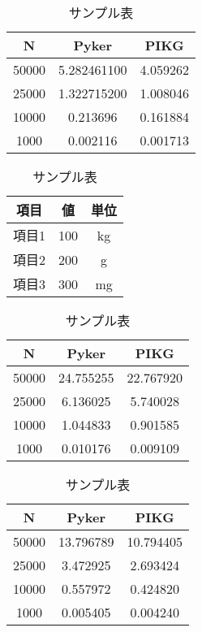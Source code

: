 
\begin{table}[ht]
  \centering %
  \caption{サンプル表} %
  \label{tab:sampleTable}
  \begin{tabular}{ccc} %
  \toprule
  N & Pyker & PIKG \\
  \midrule
  50000 & 5.282461100 & 4.059262 \\
  25000 & 1.322715200 & 1.008046 \\
  10000 & 0.213696 & 0.161884 \\
  1000 & 0.002116 & 0.001713 \\
\bottomrule
\end{tabular}
\end{table}
\begin{table}[ht]
  \centering %
  \caption{サンプル表} %
  \label{tab:sampleTable}
  \begin{tabular}{ccc} %
  \toprule
  項目 & 値 & 単位 \\
  \midrule
  項目1 & 100 & kg \\
  項目2 & 200 & g \\
  項目3 & 300 & mg \\
\bottomrule
\end{tabular}
\end{table}


\begin{table}[ht]
  \centering %
  \caption{サンプル表} %
  \label{tab:sampleTable}
  \begin{tabular}{ccc} %
  \toprule
  N & Pyker & PIKG \\
  \midrule
  50000 & 24.755255 & 22.767920 \\
  25000 & 6.136025 & 5.740028 \\
  10000 & 1.044833 & 0.901585\\
  1000 & 0.010176 & 0.009109 \\
\bottomrule
\end{tabular}
\end{table}

\begin{table}[ht]
  \centering %
  \caption{サンプル表} %
  \label{tab:sampleTable}
  \begin{tabular}{ccc} %
  \toprule
  N & Pyker & PIKG \\
  \midrule
  50000 & 13.796789& 10.794405\\
  25000 & 3.472925 & 2.693424\\
  10000 & 0.557972 & 0.424820\\
  1000 & 0.005405& 0.004240\\
\bottomrule
\end{tabular}
\end{table}



